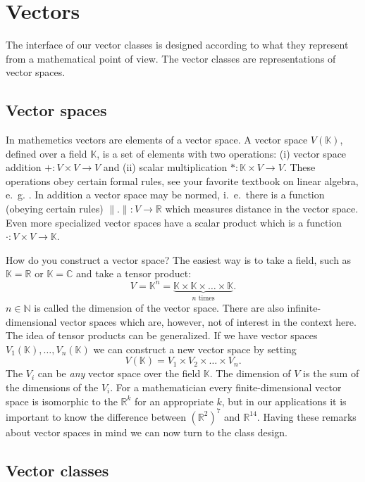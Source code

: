 \documentclass[11pt]{article}
\newcommand{\C}{\mathbb{C}}
\newcommand{\R}{\mathbb{R}}
\newcommand{\N}{\mathbb{N}}
\newcommand{\K}{\mathbb{K}}
\begin{document}
\section{Vectors}

The interface of our vector classes is designed according to what they
represent from a mathematical point of view. The vector classes are
representations of vector spaces.

\subsection{Vector spaces}

In mathemetics vectors are elements of a vector space. A vector space
$V(\K)$, defined over a field $\K$, is a set of elements with two
operations: (i) vector space addition $+ : V\times V \to V$ and (ii) scalar
multiplication $* : \K\times V \to V$. These operations obey certain formal
rules, see your favorite textbook on linear algebra,
e.~g. \cite{LaBook}. In addition a 
vector space may be normed, i.~e.~there is a function (obeying certain
rules) $\|.\| : V \to \R$ which measures distance in the vector
space. Even more specialized vector spaces have a scalar product which
is a function $\cdot : V\times V \to \K$. 

How do you construct a vector space? The easiest way is to take a
field, such as $\K=\R$ or $\K=\C$ and take a tensor product:
\begin{equation*}
V = \K^n = \underbrace{\K\times\K\times\ldots\times\K}_{\text{$n$ times}}.
\end{equation*} 
$n\in\N$ is called the dimension of the vector space. There are also
infinite-dimensional vector spaces which are, however, not of interest
in the context here. The idea of tensor products can be generalized.
If we have vector spaces $V_1(\K),\ldots,V_n(\K)$ we can construct a
new vector space by setting
\begin{equation*}
V(\K) = V_1\times V_2 \times \ldots \times V_n.
\end{equation*} 
The $V_i$ can be \textit{any} vector space over the field $\K$. The
dimension of $V$ is the sum of the dimensions of the $V_i$. For a
mathematician every finite-dimensional vector space is isomorphic to
the $\R^k$ for an appropriate $k$, but in our applications it is
important to know the difference between $(\R^2)^7$ and
$\R^{14}$. Having these remarks about vector spaces in mind we can now
turn to the class design.

\subsection{Vector classes}
\end{document}
